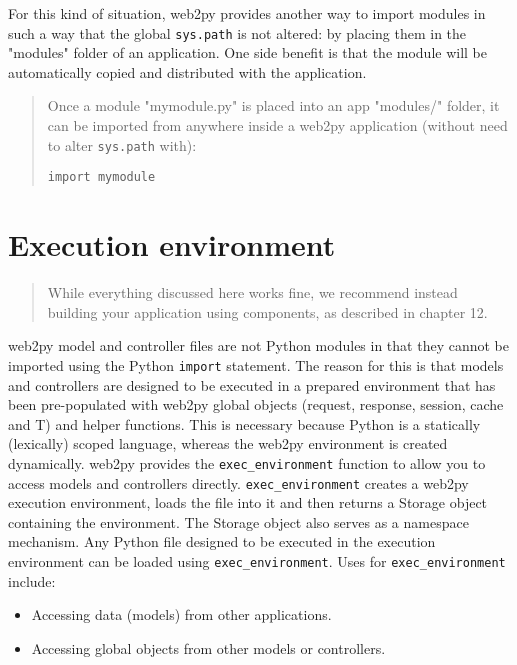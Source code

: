 \documentclass[justified,sixbynine,notoc]{tufte-book}
\def\ft{\small\tt}
\def\inxx#1{\index{#1}}
\begin{document}
\begin{fullwidth}
For this kind of situation, web2py provides another way to import modules in such a way that the global {\ft sys.path} is not altered: by placing them in the "modules" folder of an application. One side benefit is that the module will be automatically copied and distributed with the application.

\begin{quote}Once a module "mymodule.py" is placed into an app "modules/" folder, it can be imported from anywhere inside a web2py application (without need to alter {\ft sys.path} with):
\begin{lstlisting}
import mymodule
\end{lstlisting}\end{quote}
\goodbreak\section{Execution environment}

\inxx{exec\_environment}

\begin{quote}While everything discussed here works fine, we recommend instead building your application using components, as described in chapter 12.\end{quote}
web2py model and controller files are not Python modules in that they cannot be imported using the Python {\ft import} statement. The reason for this is that models and controllers are designed to be executed in a prepared environment that has been pre-populated with web2py global objects (request, response, session, cache and T) and helper functions. This is necessary because Python is a statically (lexically) scoped language, whereas the web2py environment is created dynamically.
\noindent web2py provides the {\ft exec\_environment} function to allow you to access models and controllers directly. {\ft exec\_environment} creates a web2py execution environment, loads the file into it and then returns a Storage object containing the environment. The Storage object also serves as a namespace mechanism. Any Python file designed to be executed in the execution environment can be loaded using {\ft exec\_environment}. Uses for {\ft exec\_environment} include:
\begin{itemize}
\item Accessing data (models) from other applications.

\item Accessing global objects from other models or controllers.


\end{itemize}
\end{fullwidth}
\end{document}
